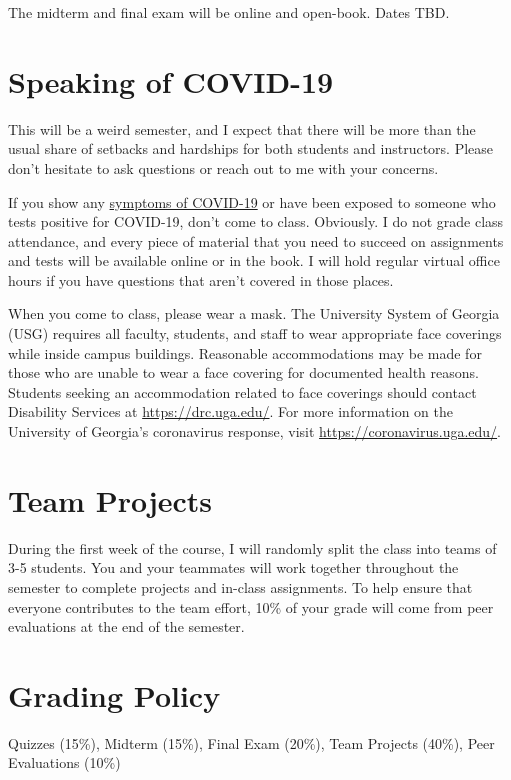 \documentclass[11pt, letterpaper]{article}
\begin{document}
The midterm and final exam will be online and open-book. Dates TBD.

\section*{Speaking of COVID-19}

This will be a weird semester, and I expect that there will be more than the usual share of setbacks and hardships for both students and instructors. Please don't hesitate to ask questions or reach out to me with your concerns. 

If you show any \href{https://www.google.com/search?q=covid-19+symptoms}{symptoms of COVID-19} or have been exposed to someone who tests positive for COVID-19, don't come to class. Obviously. I do not grade class attendance, and every piece of material that you need to succeed on assignments and tests will be available online or in the book. I will hold regular virtual office hours if you have questions that aren't covered in those places. 

When you come to class, please wear a mask. The University System of Georgia (USG) requires all faculty, students, and staff to wear appropriate face coverings while inside campus buildings. Reasonable accommodations may be made for those who are unable to wear a face covering for documented health reasons. Students seeking an accommodation related to face coverings should contact Disability Services at \href{https://drc.uga.edu/}{https://drc.uga.edu/}. For more information on the University of Georgia's coronavirus response, visit \href{https://coronavirus.uga.edu/}{https://coronavirus.uga.edu/}. 



\section*{Team Projects}

During the first week of the course, I will randomly split the class into teams of 3-5 students. You and your teammates will work together throughout the semester to complete projects and in-class assignments. To help ensure that everyone contributes to the team effort, 10\% of your grade will come from peer evaluations at the end of the semester.

\section*{Grading Policy}
Quizzes (15\%),  Midterm (15\%), Final Exam (20\%), Team Projects (40\%), Peer Evaluations (10\%)
\end{document}
